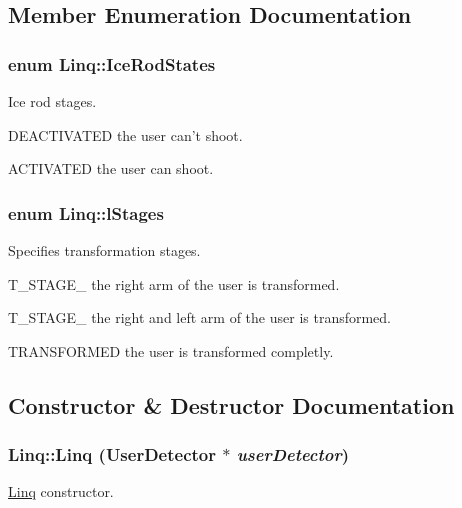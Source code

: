 \subsection{Member Enumeration Documentation}
\hypertarget{classLinq_a40047098b8a09b8eb59b005a07c9671b}{
\subsubsection[{IceRodStates}]{\setlength{\rightskip}{0pt plus 5cm}enum {\bf Linq::IceRodStates}}}
\label{classLinq_a40047098b8a09b8eb59b005a07c9671b}
Ice rod stages.


\begin{DoxyItemize}
\item DEACTIVATED the user can't shoot.
\item ACTIVATED the user can shoot. 
\end{DoxyItemize}\hypertarget{classLinq_a63d00f6589f33af65604d363574fbe51}{
\subsubsection[{lStages}]{\setlength{\rightskip}{0pt plus 5cm}enum {\bf Linq::lStages}}}
\label{classLinq_a63d00f6589f33af65604d363574fbe51}
Specifies transformation stages.


\begin{DoxyItemize}
\item T\_\-STAGE\_ the right arm of the user is transformed.
\item T\_\-STAGE\_ the right and left arm of the user is transformed.
\item TRANSFORMED the user is transformed completly. 
\end{DoxyItemize}

\subsection{Constructor \& Destructor Documentation}
\hypertarget{classLinq_abd5cf38c179739fd6bbc1b30cfc319fc}{
\subsubsection[{Linq}]{\setlength{\rightskip}{0pt plus 5cm}Linq::Linq ({\bf UserDetector} $\ast$ {\em userDetector})}}
\label{classLinq_abd5cf38c179739fd6bbc1b30cfc319fc}
\hyperlink{classLinq}{Linq} constructor.


